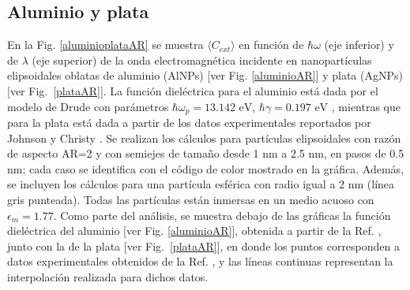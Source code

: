 \subsection*{Aluminio y plata}
En la Fig. \ref{aluminioplataAR} se muestra $\langle C_{ext}\rangle$ en función de $\hbar\omega$ (eje inferior) y de  $\lambda$ (eje superior) de la onda electromagnética incidente en nanopartículas elipsoidales oblatas de aluminio (AlNPs) [ver Fig. \ref{aluminioAR}] y plata (AgNPs) [ver Fig.~\ref{plataAR}]. La función dieléctrica para el aluminio está dada por el modelo de Drude con parámetros $\hbar\omega_p=13.142\text{ eV}$, $\hbar\gamma=0.197\text{ eV}$ \cite{Aluminio}, mientras que para la plata  está dada a partir de los datos experimentales reportados por Johnson y Christy \cite{Plata}. Se realizan los cálculos para partículas elipsoidales con razón de aspecto AR=2 y con semiejes de tamaño desde 1 nm a 2.5 nm, en pasos de 0.5 nm; cada caso se identifica con el código de color mostrado en la gráfica. Además, se incluyen los cálculos para una partícula esférica con radio igual a $2 \text{ nm}$ (línea gris punteada). Todas las partículas están  inmersas en un medio acuoso con $\epsilon_m=1.77$. Como parte del análisis, se muestra debajo de las gráficas la función dieléctrica del aluminio [ver Fig. \ref{aluminioAR}], obtenida a partir de la Ref. \cite{Aluminio}, junto con la de la plata [ver Fig.~\ref{plataAR}], en donde los puntos corresponden a datos experimentales obtenidos de la Ref. \cite{Plata}, y las líneas continuas representan la interpolación realizada para dichos datos.
\\

